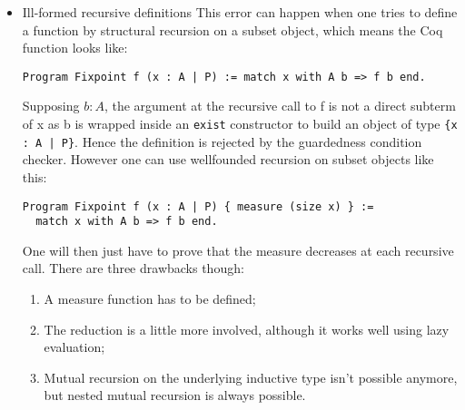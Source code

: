\begin{itemize}
\item {Ill-formed recursive definitions}
  This error can happen when one tries to define a
  function by structural recursion on a subset object, which means the Coq
  function looks like:
  
  \verb$Program Fixpoint f (x : A | P) := match x with A b => f b end.$
  
  Supposing $b : A$, the argument at the recursive call to f is not a
  direct subterm of x as b is wrapped inside an {\tt exist} constructor to build
  an object of type \verb${x : A | P}$.  Hence the definition is rejected
  by the guardedness condition checker. However one can use
  wellfounded recursion on subset objects like this:
  
\begin{verbatim}
Program Fixpoint f (x : A | P) { measure (size x) } :=
  match x with A b => f b end.
\end{verbatim}
  
  One will then just have to prove that the measure decreases at each recursive
  call. There are three drawbacks though: 
  \begin{enumerate}
  \item A measure function has to be defined;
  \item The reduction is a little more involved, although it works well
    using lazy evaluation;
  \item Mutual recursion on the underlying inductive type isn't possible
    anymore, but nested mutual recursion is always possible.
  \end{enumerate}
\end{itemize}

